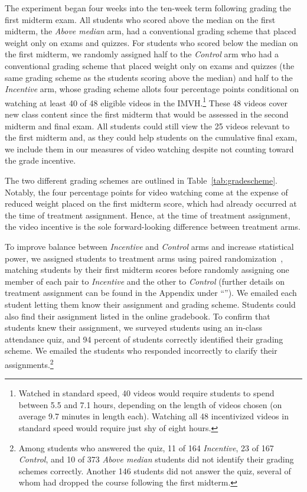 The experiment began four weeks into the ten-week term following grading the first midterm exam.
All students who scored above the median on the first midterm, the \textit{Above median} arm, had a conventional grading scheme that placed weight only on exams and quizzes.
For students who scored below the median on the first midterm, we randomly assigned half to the \textit{Control} arm who had a conventional grading scheme that placed weight only on exams and quizzes (the same grading scheme as the students scoring above the median) and half to the \textit{Incentive} arm, whose grading scheme allots four percentage points conditional on watching at least 40 of 48 eligible videos in the IMVH.\footnote{Watched in standard speed, 40 videos would require students to spend between 5.5 and 7.1 hours, depending on the length of videos chosen (on average 9.7 minutes in length each).
	Watching all 48 incentivized videos in standard speed would require just shy of eight hours.
}
These 48 videos cover new class content since the first midterm that would be assessed in the second midterm and final exam.
All students could still view the 25 videos relevant to the first midterm and, as they could help students on the cumulative final exam, we include them in our measures of video watching despite not counting toward the grade incentive.

The two different grading schemes are outlined in Table~\ref{tab:gradescheme}.
Notably, the four percentage points for video watching come at the expense of reduced weight placed on the first midterm score, which had already occurred at the time of treatment assignment.
Hence, at the time of treatment assignment, the video incentive is the sole forward-looking difference between treatment arms.


To improve balance between \textit{Incentive} and \textit{Control} arms and increase statistical power, we assigned students to treatment arms using paired randomization~\parencite{ai2017}, matching students by their first midterm scores before randomly assigning one member of each pair to \textit{Incentive} and the other to \textit{Control} (further details on treatment assignment can be found in the Appendix under ``'').
We emailed each student letting them know their assignment and grading scheme.
Students could also find their assignment listed in the online gradebook.
To confirm that students knew their assignment, we surveyed students using an in-class attendance quiz, and 94 percent of students correctly identified their grading scheme.
We emailed the students who responded incorrectly to clarify their assignments.\footnote{Among students who answered the quiz, 11 of 164 \textit{Incentive}, 23 of 167 \textit{Control}, and 10 of 373 \textit{Above median} students did not identify their grading schemes correctly. Another 146 students did not answer the quiz, several of whom had dropped the course following the first midterm.}

